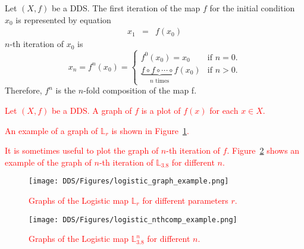 \begin{definition}
    Let $\left( X, f \right)$ be a DDS. 
    The first iteration of the map $f$ for the initial condition $x_0$ is represented by equation
    \begin{eqnarray}
        x_{1}  & = & f(x_{0})
    \end{eqnarray}
    $n$-th iteration of $x_0$ is
    \begin{equation}
    x_{n} = f^{n}(x_0) =
        \begin{cases}
            f^{0}(x_0) = x_0 & \text{if } n = 0. \\
            \underbrace{f \circ f \circ \cdots \circ f}_\text{$n$ times}(x_0) & \text{if } n > 0. 
        \end{cases}
    \end{equation}
    Therefore, $f^{n}$ is the $n$-fold composition of the map f.
\end{definition}

\begin{definition}[Graph]
\textcolor{red}{
    Let $\left( X, f \right)$ be a DDS. A graph of $f$ is a plot of $f(x)$ for each $x \in X$.
}
\end{definition}

\begin{remark}
    \textcolor{red}{
    An example of a graph of $\mathbb{L}_{r}$ is shown in Figure~\ref{fig:logistic_graph_example}.
    }
    \par
    \textcolor{red}{
    It is sometimes useful to plot the graph of $n$-th iteration of $f$.
     Figure~\ref{fig:logistic_nthcomp_example} shows an example of the graph of $n$-th iteration of $\mathbb{L}_{3.8}$ for different $n$.
    }
\end{remark}

\begin{figure}[!h]
    \centering
    \texttt{[image: DDS/Figures/logistic\_graph\_example.png]}
    \caption{
        \textcolor{red}{
        Graphs of the Logistic map $\mathbb{L}_{r}$ for different parameters $r$.
        }
    }
    \label{fig:logistic_graph_example}
\end{figure}

\begin{figure}[!h]
    \centering
    \texttt{[image: DDS/Figures/logistic\_nthcomp\_example.png]}
    \caption{
        \textcolor{red}{
        Graphs of the Logistic map $\mathbb{L}_{3.8}^{n}$ for different $n$.
        }
    }
    \label{fig:logistic_nthcomp_example}
\end{figure}

